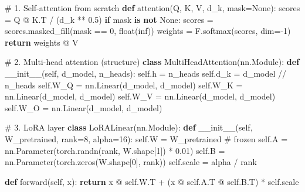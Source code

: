 \documentclass[11pt]{article}
\newenvironment{Shaded}{\begin{snugshade}}{\end{snugshade}}
\newcommand{\BuiltInTok}[1]{\textcolor[rgb]{0.50,0.55,0.55}{#1}}
\newcommand{\CommentTok}[1]{\textcolor[rgb]{0.48,0.49,0.49}{#1}}
\newcommand{\ControlFlowTok}[1]{\textcolor[rgb]{0.99,0.74,0.29}{\textbf{#1}}}
\newcommand{\DecValTok}[1]{\textcolor[rgb]{0.96,0.45,0.00}{#1}}
\newcommand{\FloatTok}[1]{\textcolor[rgb]{0.96,0.45,0.00}{#1}}
\newcommand{\FunctionTok}[1]{\textcolor[rgb]{0.56,0.27,0.68}{#1}}
\newcommand{\KeywordTok}[1]{\textcolor[rgb]{0.81,0.81,0.76}{\textbf{#1}}}
\newcommand{\NormalTok}[1]{\textcolor[rgb]{0.81,0.81,0.76}{#1}}
\newcommand{\OperatorTok}[1]{\textcolor[rgb]{0.81,0.81,0.76}{#1}}
\newcommand{\StringTok}[1]{\textcolor[rgb]{0.96,0.31,0.31}{#1}}
\newcommand{\VariableTok}[1]{\textcolor[rgb]{0.15,0.68,0.68}{#1}}
\begin{document}
\begin{Shaded}
\begin{Highlighting}[]
\CommentTok{\# 1. Self{-}attention from scratch}
\KeywordTok{def}\NormalTok{ attention(Q, K, V, d\_k, mask}\OperatorTok{=}\VariableTok{None}\NormalTok{):}
\NormalTok{    scores }\OperatorTok{=}\NormalTok{ Q }\OperatorTok{@}\NormalTok{ K.T }\OperatorTok{/}\NormalTok{ (d\_k }\OperatorTok{**} \FloatTok{0.5}\NormalTok{)}
    \ControlFlowTok{if}\NormalTok{ mask }\KeywordTok{is} \KeywordTok{not} \VariableTok{None}\NormalTok{:}
\NormalTok{        scores }\OperatorTok{=}\NormalTok{ scores.masked\_fill(mask }\OperatorTok{==} \DecValTok{0}\NormalTok{, }\BuiltInTok{float}\NormalTok{(}\StringTok{\textquotesingle{}{-}inf\textquotesingle{}}\NormalTok{))}
\NormalTok{    weights }\OperatorTok{=}\NormalTok{ F.softmax(scores, dim}\OperatorTok{={-}}\DecValTok{1}\NormalTok{)}
    \ControlFlowTok{return}\NormalTok{ weights }\OperatorTok{@}\NormalTok{ V}

\CommentTok{\# 2. Multi{-}head attention (structure)}
\KeywordTok{class}\NormalTok{ MultiHeadAttention(nn.Module):}
    \KeywordTok{def} \FunctionTok{\_\_init\_\_}\NormalTok{(}\VariableTok{self}\NormalTok{, d\_model, n\_heads):}
        \VariableTok{self}\NormalTok{.h }\OperatorTok{=}\NormalTok{ n\_heads}
        \VariableTok{self}\NormalTok{.d\_k }\OperatorTok{=}\NormalTok{ d\_model }\OperatorTok{//}\NormalTok{ n\_heads}
        \VariableTok{self}\NormalTok{.W\_Q }\OperatorTok{=}\NormalTok{ nn.Linear(d\_model, d\_model)}
        \VariableTok{self}\NormalTok{.W\_K }\OperatorTok{=}\NormalTok{ nn.Linear(d\_model, d\_model)}
        \VariableTok{self}\NormalTok{.W\_V }\OperatorTok{=}\NormalTok{ nn.Linear(d\_model, d\_model)}
        \VariableTok{self}\NormalTok{.W\_O }\OperatorTok{=}\NormalTok{ nn.Linear(d\_model, d\_model)}

\CommentTok{\# 3. LoRA layer}
\KeywordTok{class}\NormalTok{ LoRALinear(nn.Module):}
    \KeywordTok{def} \FunctionTok{\_\_init\_\_}\NormalTok{(}\VariableTok{self}\NormalTok{, W\_pretrained, rank}\OperatorTok{=}\DecValTok{8}\NormalTok{, alpha}\OperatorTok{=}\DecValTok{16}\NormalTok{):}
        \VariableTok{self}\NormalTok{.W }\OperatorTok{=}\NormalTok{ W\_pretrained  }\CommentTok{\# frozen}
        \VariableTok{self}\NormalTok{.A }\OperatorTok{=}\NormalTok{ nn.Parameter(torch.randn(rank, W.shape[}\DecValTok{1}\NormalTok{]) }\OperatorTok{*} \FloatTok{0.01}\NormalTok{)}
        \VariableTok{self}\NormalTok{.B }\OperatorTok{=}\NormalTok{ nn.Parameter(torch.zeros(W.shape[}\DecValTok{0}\NormalTok{], rank))}
        \VariableTok{self}\NormalTok{.scale }\OperatorTok{=}\NormalTok{ alpha }\OperatorTok{/}\NormalTok{ rank}
    
    \KeywordTok{def}\NormalTok{ forward(}\VariableTok{self}\NormalTok{, x):}
        \ControlFlowTok{return}\NormalTok{ x }\OperatorTok{@} \VariableTok{self}\NormalTok{.W.T }\OperatorTok{+}\NormalTok{ (x }\OperatorTok{@} \VariableTok{self}\NormalTok{.A.T }\OperatorTok{@} \VariableTok{self}\NormalTok{.B.T) }\OperatorTok{*} \VariableTok{self}\NormalTok{.scale}
\end{Highlighting}
\end{Shaded}
\end{document}
